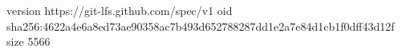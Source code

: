 version https://git-lfs.github.com/spec/v1
oid sha256:4622a4e6a8ed73ae90358ac7b493d652788287dd1e2a7e84d1cb1f0dff43d12f
size 5566
